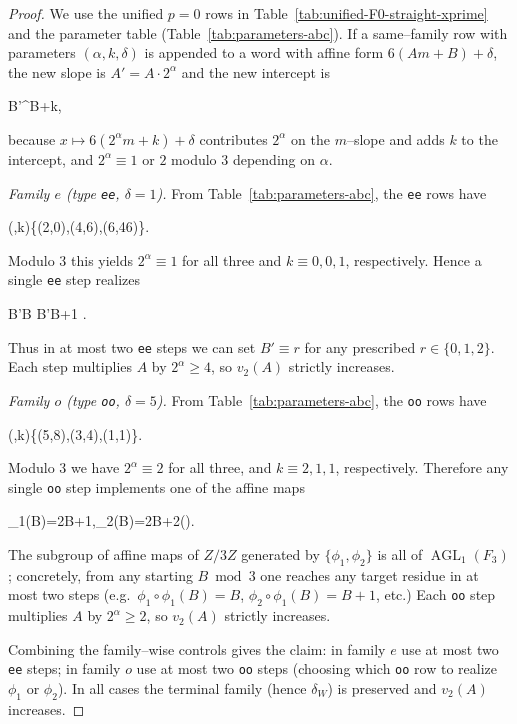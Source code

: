 \documentclass[11pt,letterpaper]{amsart}
\def\mathrm#1{#1}%
\def\mathbb#1{#1}%
\def\[{ }%
\def\]{ }%
\theoremstyle{definition}
\theoremstyle{plain}
\theoremstyle{plain}
\theoremstyle{remark}
\begin{document}
\begin{proof}
We use the unified $p{=}0$ rows in Table~\ref{tab:unified-F0-straight-xprime} and the parameter table (Table~\ref{tab:parameters-abc}). If a same–family row with parameters $(\alpha,k,\delta)$ is appended to a word with affine form $6(A m+B)+\delta$, the new slope is $A'=A\cdot 2^{\alpha}$ and the new intercept is
\[
B'\;\equiv{}^{\alpha}B+k,
\]
because $x\mapsto 6(2^{\alpha}m+k)+\delta$ contributes $2^{\alpha}$ on the $m$–slope and adds $k$ to the intercept, and $2^{\alpha}\equiv 1$ or $2$ modulo $3$ depending on $\alpha$.


\smallskip\noindent\emph{Family $\mathrm e$ (type \textup{\texttt{ee}}, $\delta=1$).}
From Table~\ref{tab:parameters-abc}, the \texttt{ee} rows have
\[
(\alpha,k)\in\{(2,0),(4,6),(6,46)\}.
\]
Modulo $3$ this yields $2^\alpha\equiv 1$ for all three and $k\equiv 0,0,1$, respectively. Hence a single \texttt{ee} step realizes
\[
B'\equiv B \quad{}\quad B'\equiv B+1 .
\]
Thus in at most two \texttt{ee} steps we can set $B'\equiv r$ for any prescribed $r\in\{0,1,2\}$. Each step multiplies $A$ by $2^{\alpha}\ge 4$, so $v_2(A)$ strictly increases.

\smallskip\noindent\emph{Family $\mathrm o$ (type \textup{\texttt{oo}}, $\delta=5$).}
From Table~\ref{tab:parameters-abc}, the \texttt{oo} rows have
\[
(\alpha,k)\in\{(5,8),(3,4),(1,1)\}.
\]
Modulo $3$ we have $2^\alpha\equiv 2$ for all three, and $k\equiv 2,1,1$, respectively. Therefore any single \texttt{oo} step implements one of the affine maps
\[
\phi_1(B)=2B+1,\qquad \phi_2(B)=2B+2\qquad ().
\]
The subgroup of affine maps of $\mathbb{Z}/3\mathbb{Z}$ generated by $\{\phi_1,\phi_2\}$ is all of $\operatorname{AGL}_1(\mathbb{F}_3)$; concretely, from any starting $B\bmod 3$ one reaches any target residue in at most two steps (e.g.\ $\phi_1\circ\phi_1(B)=B$, $\phi_2\circ\phi_1(B)=B+1$, etc.) Each \texttt{oo} step multiplies $A$ by $2^{\alpha}\ge 2$, so $v_2(A)$ strictly increases.

\smallskip
Combining the family–wise controls gives the claim: in family $\mathrm e$ use at most two \texttt{ee} steps; in family $\mathrm o$ use at most two \texttt{oo} steps (choosing which \texttt{oo} row to realize $\phi_1$ or $\phi_2$). In all cases the terminal family (hence $\delta_W$) is preserved and $v_2(A)$ increases.
\end{proof}
\end{document}
